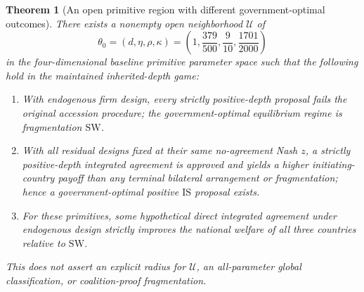 \documentclass[11pt,a4paper]{article}
\newtheorem{theorem}{Theorem}
\theoremstyle{remark}\newtheorem{remark}[theorem]{Remark}
\newcommand{\SW}{\mathrm{SW}}\newcommand{\SU}{\mathrm{SU}}\newcommand{\IS}{\mathrm{IS}}
\begin{document}
\begin{theorem}[An open primitive region with different government-optimal outcomes]\label{thm:open}
There exists a nonempty open neighborhood $\mathcal U$ of
\begin{equation}\label{eq:theta}
\theta_0=(d,\eta,\rho,\kappa)=\left(1,\frac{379}{500},\frac9{10},\frac{1701}{2000}\right)
\end{equation}
in the four-dimensional baseline primitive parameter space such that the following hold in the maintained inherited-depth game:
\begin{enumerate}
\item With endogenous firm design, every strictly positive-depth proposal fails the original accession procedure; the government-optimal equilibrium regime is fragmentation $\SW$.
\item With all residual designs fixed at their \emph{same} no-agreement Nash $z$, a strictly positive-depth integrated agreement is approved and yields a higher initiating-country payoff than any terminal bilateral arrangement or fragmentation; hence a government-optimal positive $\IS$ proposal exists.
\item For these primitives, some hypothetical direct integrated agreement under endogenous design strictly improves the national welfare of all three countries relative to $\SW$.
\end{enumerate}
This does not assert an explicit radius for $\mathcal U$, an all-parameter global classification, or coalition-proof fragmentation.
\end{theorem}
\end{document}
